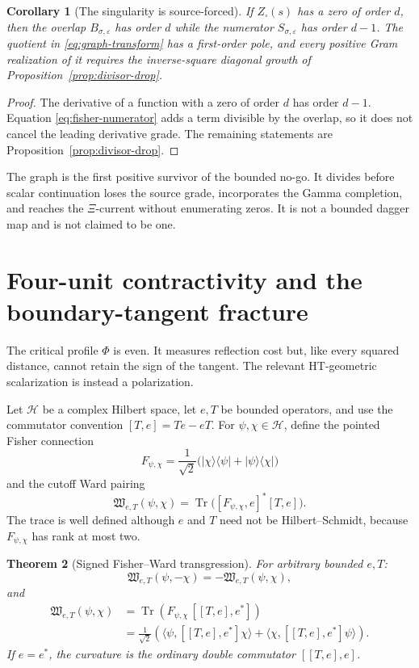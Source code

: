 \documentclass[11pt]{article}
\newtheorem{theorem}{Theorem}[section]
\newtheorem{corollary}[theorem]{Corollary}
\theoremstyle{definition}
\theoremstyle{remark}
\begin{document}
\begin{corollary}[The singularity is source-forced]\label{cor:source-forced}
If \(Z_\square(s)\) has a zero of order \(d\), then the overlap
\(B_{\sigma,\varepsilon}\) has order \(d\) while the numerator
\(S_{\sigma,\varepsilon}\) has order \(d-1\).  The quotient in
\eqref{eq:graph-transform} has a first-order pole, and every positive Gram realization of it
requires the inverse-square diagonal growth of Proposition~\ref{prop:divisor-drop}.
\end{corollary}

\begin{proof}
The derivative of a function with a zero of order \(d\) has order \(d-1\).
Equation \eqref{eq:fisher-numerator} adds a term divisible by the overlap, so it does not cancel
the leading derivative grade.  The remaining statements are
Proposition~\ref{prop:divisor-drop}.
\end{proof}

The graph is the first positive survivor of the bounded no-go.  It divides before scalar
continuation loses the source grade, incorporates the Gamma completion, and reaches the
\(\Xi\)-current without enumerating zeros.  It is not a bounded dagger map and is not claimed to
be one.

\section{Four-unit contractivity and the boundary-tangent fracture}
\label{sec:ward-boundary}

The critical profile \(\Phi\) is even.  It measures reflection cost but, like every squared
distance, cannot retain the sign of the tangent.  The relevant HT-geometric scalarization is
instead a polarization.

Let \(\mathcal H\) be a complex Hilbert space, let \(e,T\) be bounded operators, and use the
commutator convention \([T,e]=Te-eT\).  For \(\psi,\chi\in\mathcal H\), define the pointed
Fisher connection
\[
 F_{\psi,\chi}=\frac1{\sqrt2}
 \bigl(|\chi\rangle\langle\psi|+|\psi\rangle\langle\chi|\bigr)
 \tag{10.1}\label{eq:pointed-fisher}
\]
and the cutoff Ward pairing
\[
 \mathfrak W_{e,T}(\psi,\chi)=
 \operatorname{Tr}\bigl([F_{\psi,\chi},e]^*[T,e]\bigr).
 \tag{10.2}\label{eq:pointed-ward}
\]
The trace is well defined although \(e\) and \(T\) need not be Hilbert--Schmidt, because
\(F_{\psi,\chi}\) has rank at most two.

\begin{theorem}[Signed Fisher--Ward transgression]\label{thm:signed-transgression}
For arbitrary bounded \(e,T\):
\[
 \mathfrak W_{e,T}(\psi,-\chi)
 =-\mathfrak W_{e,T}(\psi,\chi),
 \tag{10.3}\label{eq:ward-odd}
\]
and
\[
 \begin{aligned}
 \mathfrak W_{e,T}(\psi,\chi)
 &=\operatorname{Tr}\!\left(
 F_{\psi,\chi}\,[[T,e],e^*]\right)\\
 &=\frac1{\sqrt2}\left(
 \langle\psi,[[T,e],e^*]\chi\rangle+
 \langle\chi,[[T,e],e^*]\psi\rangle\right).
 \end{aligned}
 \tag{10.4}\label{eq:signed-transgression}
\]
If \(e=e^*\), the curvature is the ordinary double commutator \([[T,e],e]\).
\end{theorem}
\end{document}
